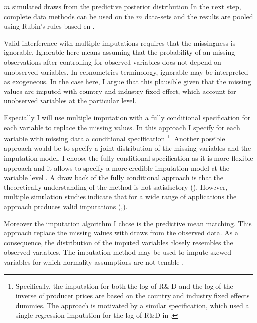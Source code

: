  $m$ simulated draws from the predictive posterior distribution
In the next step, complete data methods can be used on the $m$ data-sets and the results are pooled using Rubin's rules based on \textcite[p.77]{Rubin1987}.  \par
Valid interference with multiple imputations requires that the missingness is ignorable.
Ignorable here means assuming that the probability of an missing observations after controlling for observed variables does not depend on unobserved variables.
In econometrics terminology, ignorable may be interpreted as exogeneous.
In the case here, I argue that this plausible  given that the missing values are imputed with country and industry fixed effect, which account for unobserved variables at the particular level.
  \par  Especially I will use multiple imputation with a fully conditional specification for each variable to replace the missing values.
In this approach I specify for each variable with missing data a conditional specification
\footnote{Specifically, the imputation for both the log of R\& D and the log of the inverse of producer prices are based on the country and industry fixed effects dummies. The approach is motivated by a similar specification, which used a single regression imputation for the log of R\&D in \textcite{costinot}.}.
Another possible approach would be to specify a joint distribution of the missing variables and the imputation model.
I choose the fully conditional specification as it is more flexible approach and it allows to specify a more credible imputation model at the variable level \textcite{van2000mice}.
A draw back of the fully conditional approach is that the theoretically understanding of the method is not satisfactory   (\textcite{van2007multiple}).
However, multiple simulation studies indicate that for a wide range of applications the approach produces valid imputations (\textcite{van2007multiple},\textcite{van2006fully}). \par
Moreover the imputation algorithm I chose is the predictive mean matching.
This approach replace the missing values with draws from the observed data.
As a consequence, the distribution of the imputed variables closely resembles the observed variables.
The imputation method may be used to impute skewed variables for which normality assumptions are not tenable \parencite{}. \par
